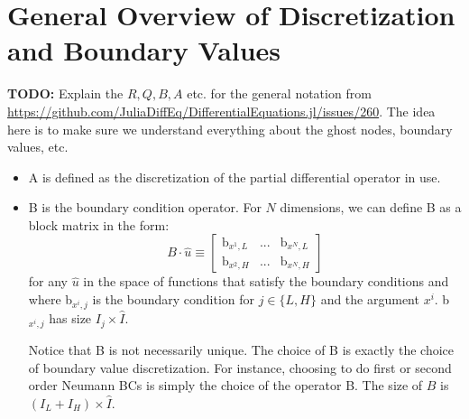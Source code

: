 \documentclass[11pt]{article}
\begin{document}
	\section{General Overview of Discretization and Boundary Values}\label{sec:general}
	\textbf{TODO:} Explain the $R, Q, B, A$ etc. for the general notation from \url{https://github.com/JuliaDiffEq/DifferentialEquations.jl/issues/260}.  The idea here is to make sure we understand everything about the ghost nodes, boundary values, etc.
	\begin{itemize}
		\item A is defined as the discretization of the partial differential operator in use.
		
		\item B is the boundary condition operator. For $N$ dimensions, we can define B as a block matrix in the form:
		\begin{equation}
		B\cdot \hat{u} \equiv \begin{bmatrix}
		\text{b}_{x^{1},L} & ... & \text{b}_{x^{N},L}\\
		\text{b}_{x^{2},H} & ... & \text{b}_{x^{N},H}
		\end{bmatrix}\label{B_operator_block}
		\end{equation}
		for any $\hat{u}$ in the space of functions that satisfy the boundary conditions and where b$_{x^i,j}$ is the boundary condition for $j \in \{L,H\}$ and the argument $x^i$. b$_{x^i,j}$ has size $I_j \times \hat{I}$. 
		
		Notice that B is not necessarily unique. The choice of B is exactly the choice of boundary value discretization. For instance, choosing to do first or second order Neumann BCs is simply the choice of the operator B. The size of $B$ is $(I_L + I_H) \times \hat{I}$.
		

\end{itemize}
\end{document}

